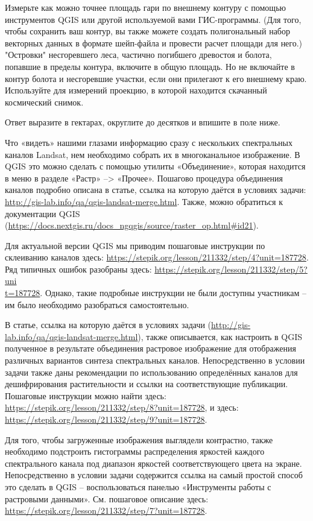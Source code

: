 Измерьте как можно точнее площадь гари по внешнему контуру с помощью инструментов QGIS или другой используемой вами ГИС-программы. (Для того, чтобы сохранить ваш контур, вы также можете создать полигональный набор векторных данных в формате шейп-файла и провести расчет площади для него.) "Островки" несгоревшего леса, частично погибшего древостоя и болота, попавшие в пределы контура, включите в общую площадь. Но не включайте в контур болота и несгоревшие участки, если они прилегают к его внешнему краю. Используйте для измерений проекцию, в которой находится скачанный космический снимок.

Ответ выразите в гектарах, округлите до десятков и впишите в поле ниже.

\explanationSection

Что «видеть» нашими глазами информацию сразу с нескольких спектральных каналов Landsat, нем необходимо собрать их в многоканальное изображение. В QGIS это можно сделать с помощью утилиты «Объединение», которая находится в меню в разделе «Растр» --> «Прочее». Пошагово процедура объединения каналов подробно описана в статье, ссылка на которую даётся в условиях задачи: \url{http://gis-lab.info/qa/qgis-landsat-merge.html}. Также, можно обратиться к документации QGIS (\url{https://docs.nextgis.ru/docs_ngqgis/source/raster_op.html#id21}).

Для актуальной версии QGIS мы приводим пошаговые инструкции по склеиванию каналов здесь: \url{https://stepik.org/lesson/211332/step/4?unit=187728}. Ряд типичных ошибок разобраны здесь: \url{https://stepik.org/lesson/211332/step/5?uni} \\ \url{t=187728}. Однако, такие подробные инструкции не были доступны участникам – им было необходимо разобраться самостоятельно.

В статье, ссылка на которую даётся в условиях задачи (\url{http://gis-lab.info/qa/qgis-landsat-merge.html}), также описывается, как настроить в QGIS полученное в результате объединения растровое изображение для отображения различных вариантов синтеза спектральных каналов. Непосредственно в условии задачи также даны рекомендации по использованию определённых каналов для дешифрирования растительности и ссылки на соответствующие публикации. Пошаговые инструкции можно найти здесь: \url{https://stepik.org/lesson/211332/step/8?unit=187728}, и здесь: \url{https://stepik.org/lesson/211332/step/9?unit=187728}.

Для того, чтобы загруженные изображения выглядели контрастно, также необходимо подстроить гистограммы распределения яркостей каждого спектрального канала под диапазон яркостей соответствующего цвета на экране. Непосредственно в условии задачи содержится ссылка на самый простой способ это сделать в QGIS – воспользоваться панелью «Инструменты работы с растровыми данными». См. пошаговое описание здесь: \url{https://stepik.org/lesson/211332/step/7?unit=187728}.

